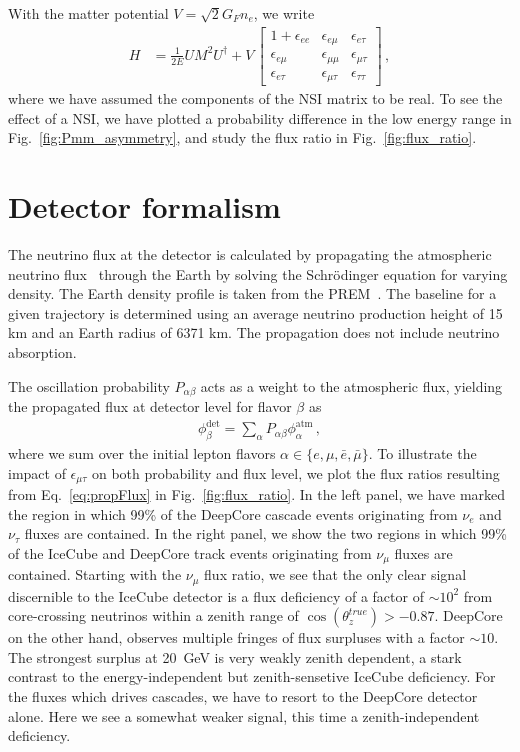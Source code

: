 \documentclass[draft=True]{revtex4-2}
\newcommand{\ztrue}{\ensuremath{\cos{(\theta_z^{true})}}}
\newcommand{\emt}{\ensuremath{\epsilon_{\mu\tau}}}
\renewcommand{\ne}{\nu_e}
\newcommand{\nm}{\nu_\mu}
\newcommand{\nt}{\nu_\tau}
\begin{document}
With the matter potential $V = \sqrt{2}G_F n_e$, we write
\begin{align} \label{eq:H_NSI}
   H &= \frac{1}{2E} UM^2U^\dagger + V\,
   \begin{bmatrix}
      1 + \epsilon_{ee} & \epsilon_{e\mu} & \epsilon_{e\tau}  \\
      \epsilon_{e\mu} & \epsilon_{\mu\mu} & \epsilon_{\mu\tau}  \\
      \epsilon_{e \tau} & \epsilon_{\mu\tau} & \epsilon_{\tau\tau}
  \end{bmatrix}\,,
\end{align}
where we have assumed the components of the NSI matrix to be real. To see the effect of a NSI, we have plotted a probability difference in the low energy range in Fig.~\ref{fig:Pmm_asymmetry}, and study
the flux ratio in Fig.~\ref{fig:flux_ratio}.

\section{Detector formalism}
The neutrino flux at the detector is calculated by propagating the atmospheric neutrino flux~\cite{hondapaper} through the Earth by solving the 
Schrödinger equation for varying density. The Earth density profile is taken from the PREM~\cite{PREM}. The baseline for a given trajectory is determined using an average neutrino
production height of 15 km and an Earth radius of 6371 km. The propagation does not include neutrino absorption.


The oscillation probability $P_{\alpha \beta}$ acts as a weight to the atmospheric flux, yielding the propagated flux at detector level for flavor $\beta$ as 
\begin{align}\label{eq:propFlux}
    \phi_\beta^\text{det} = \sum_\alpha P_{\alpha\beta} \phi_\alpha^\text{atm} \,,
\end{align}
where we sum over the initial lepton flavors $\alpha \in \{e,\mu, \bar{e}, \bar{\mu}\}$. To illustrate the impact of $\emt$ on both probability
and flux level, we plot the flux ratios resulting from Eq.~\ref{eq:propFlux} in Fig.~\ref{fig:flux_ratio}. In the left panel, we have marked the region in which 99\% of the 
DeepCore cascade events originating from $\ne$ and $\nt$ fluxes are contained. In the right panel, we show the two regions in which 99\% of the IceCube 
and DeepCore track events originating from $\nm$ fluxes are contained. Starting with the $\nm$ flux ratio, we see that the only clear signal discernible to the IceCube detector
is a flux deficiency of a factor of $\sim 10^2$ from core-crossing neutrinos within a zenith range of $\ztrue > -0.87$. DeepCore on the other hand, 
observes multiple fringes of flux surpluses with a factor $\sim 10$. The strongest surplus at \SI{20}{\GeV} is very weakly zenith dependent, a stark contrast to the
energy-independent but zenith-sensetive IceCube deficiency.
For the fluxes which drives cascades, we have to resort to the DeepCore detector alone. %
Here we see a somewhat weaker signal, this time a zenith-independent deficiency. 
\end{document}

